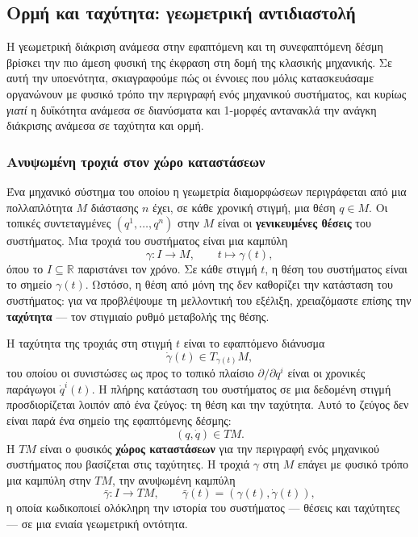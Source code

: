 \documentclass[11pt,a4paper,twoside,openright]{book}
\begin{document}
\subsection{Ορμή και ταχύτητα: γεωμετρική αντιδιαστολή}

Η γεωμετρική διάκριση ανάμεσα στην εφαπτόμενη και τη συνεφαπτόμενη δέσμη βρίσκει την πιο άμεση φυσική της έκφραση στη δομή της κλασικής μηχανικής. Σε αυτή την υποενότητα, σκιαγραφούμε πώς οι έννοιες που μόλις κατασκευάσαμε οργανώνουν με φυσικό τρόπο την περιγραφή ενός μηχανικού συστήματος, και κυρίως \emph{γιατί} η δυϊκότητα ανάμεσα σε διανύσματα και 1-μορφές αντανακλά την ανάγκη διάκρισης ανάμεσα σε ταχύτητα και ορμή.

\subsubsection{Ανυψωμένη τροχιά στον χώρο καταστάσεων}

Ένα μηχανικό σύστημα του οποίου η γεωμετρία διαμορφώσεων περιγράφεται από μια πολλαπλότητα $M$ διάστασης $n$ έχει, σε κάθε χρονική στιγμή, μια θέση $q \in M$. Οι τοπικές συντεταγμένες $(q^1, \dots, q^n)$ στην $M$ είναι οι \textbf{γενικευμένες θέσεις} του συστήματος. Μια τροχιά του συστήματος είναι μια καμπύλη
\begin{equation}
\gamma: I \to M, \qquad t \mapsto \gamma(t),
\end{equation}
όπου το $I \subseteq \mathbb{R}$ παριστάνει τον χρόνο. Σε κάθε στιγμή $t$, η θέση του συστήματος είναι το σημείο $\gamma(t)$. Ωστόσο, η θέση από μόνη της δεν καθορίζει την κατάσταση του συστήματος: για να προβλέψουμε τη μελλοντική του εξέλιξη, χρειαζόμαστε επίσης την \textbf{ταχύτητα} --- τον στιγμιαίο ρυθμό μεταβολής της θέσης.

Η ταχύτητα της τροχιάς στη στιγμή $t$ είναι το εφαπτόμενο διάνυσμα
\begin{equation}
\dot{\gamma}(t) \in T_{\gamma(t)}M,
\end{equation}
του οποίου οι συνιστώσες ως προς το τοπικό πλαίσιο $\partial / \partial q^i$ είναι οι χρονικές παράγωγοι $\dot{q}^i(t)$. Η πλήρης κατάσταση του συστήματος σε μια δεδομένη στιγμή προσδιορίζεται λοιπόν από ένα ζεύγος: τη θέση και την ταχύτητα. Αυτό το ζεύγος δεν είναι παρά ένα σημείο της εφαπτόμενης δέσμης:
\begin{equation}
(q, \dot{q}) \in TM.
\end{equation}
Η $TM$ είναι ο φυσικός \textbf{χώρος καταστάσεων} για την περιγραφή ενός μηχανικού συστήματος που βασίζεται στις ταχύτητες. Η τροχιά $\gamma$ στη $M$ επάγει με φυσικό τρόπο μια καμπύλη στην $TM$, την ανυψωμένη καμπύλη
\begin{equation}
\bar{\gamma}: I \to TM, \qquad \bar{\gamma}(t) = (\gamma(t), \dot{\gamma}(t)),
\end{equation}
η οποία κωδικοποιεί ολόκληρη την ιστορία του συστήματος --- θέσεις και ταχύτητες --- σε μια ενιαία γεωμετρική οντότητα.
\end{document}
